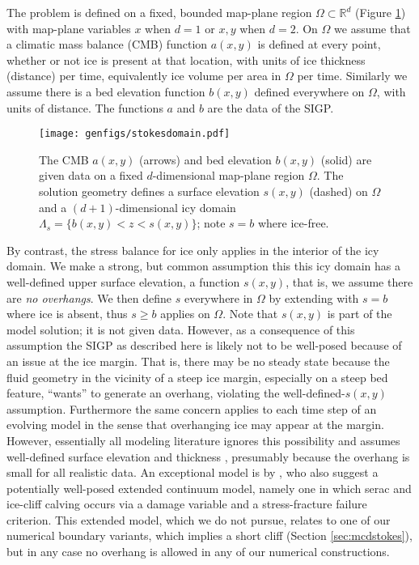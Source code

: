 \documentclass[letterpaper,final,12pt,reqno]{amsart}
\theoremstyle{claim}
\newcommand{\RR}{\mathbb{R}}
\numberwithin{equation}{section}
\numberwithin{figure}{section}
\numberwithin{table}{section}
\numberwithin{theorem}{section}
\begin{document}
The problem is defined on a fixed, bounded map-plane region $\Omega \subset \RR^d$ (Figure \ref{fig:stokesdomain}) with map-plane variables $x$ when $d=1$ or $x,y$ when $d=2$.  On $\Omega$ we assume that a climatic mass balance (CMB) function $a(x,y)$ is defined at every point, whether or not ice is present at that location, with units of ice thickness (distance) per time, equivalently ice volume per area in $\Omega$ per time.  Similarly we assume there is a bed elevation function $b(x,y)$ defined everywhere on $\Omega$, with units of distance.  The functions $a$ and $b$ are the data of the SIGP.

\begin{figure}[ht]
\begin{center}
\texttt{[image: genfigs/stokesdomain.pdf]}
\end{center}
\caption{The CMB $a(x,y)$ (arrows) and bed elevation $b(x,y)$ (solid) are given data on a fixed $d$-dimensional map-plane region $\Omega$.  The solution geometry defines a surface elevation $s(x,y)$ (dashed) on $\Omega$ and a $(d+1)$-dimensional icy domain $\Lambda_s = \{b(x,y) < z < s(x,y)\}$; note $s=b$ where ice-free.}
\label{fig:stokesdomain}
\end{figure}

By contrast, the stress balance for ice only applies in the interior of the icy domain.  We make a strong, but common \cite[for example]{IsaacStadlerGhattas2015,Jouvetetal2008,Lengetal2012,WirbelJarosch2020} assumption this this icy domain has a well-defined upper surface elevation, a function $s(x,y)$, that is, we assume there are \emph{no overhangs}.  We then define $s$ everywhere in $\Omega$ by extending with $s=b$ where ice is absent, thus $s\ge b$ applies on $\Omega$.  Note that $s(x,y)$ is part of the model solution; it is not given data.  However, as a consequence of this assumption the SIGP as described here is likely not to be well-posed because of an issue at the ice margin.  That is, there may be no steady state because the fluid geometry in the vicinity of a steep ice margin, especially on a steep bed feature, ``wants'' to generate an overhang, violating the well-defined-$s(x,y)$ assumption.  Furthermore the same concern applies to each time step of an evolving model in the sense that overhanging ice may appear at the margin.  However, essentially all modeling literature ignores this possibility and assumes well-defined surface elevation and thickness \cite{Jouvetetal2008,Lengetal2012,WirbelJarosch2020}, presumably because the overhang is small for all realistic data.  An exceptional model is by \cite{PralongFunk2005}, who also suggest a potentially well-posed extended continuum model, namely one in which serac and ice-cliff calving occurs via a damage variable and a stress-fracture failure criterion.  This extended model, which we do not pursue, relates to one of our numerical boundary variants, which implies a short cliff (Section \ref{sec:mcdstokes}), but in any case no overhang is allowed in any of our numerical constructions.
\end{document}
